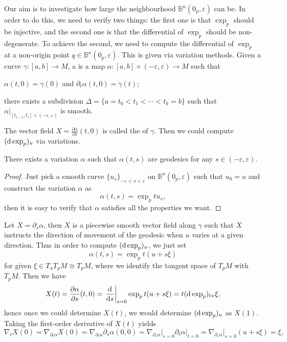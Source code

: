 Our aim is to investigate how large the neighbourhood $\mathbb{B}^n (0_p ,\varepsilon )$ can be. In order to do this, we need to verify two things: the first one is that $\exp_p $ should be injective, and the second one is that the differential of $\exp_p $ should be non-degenerate. To achieve the second, we need to compute the differential of $\exp_p $ at a non-origin point $q\in\mathbb{B}^n (0_p ,\varepsilon )$. This is given via variation methods. Given a curve $\gamma\colon [a,b]\to M$, a  is a map $\alpha\colon [a,b]\times (-\varepsilon ,\varepsilon )\to M$ such that \begin{enumerate*}\item $\alpha (t,0)=\gamma (0)$ and $\partial_t\alpha (t,0)=\dot{\gamma } (t)$;\item there exists a subdivision $\Delta =\{a=t_0 <t_1 <\dotsb <t_k =b\} $ such that $\alpha\vert_{[t_{i-1} ,t_i ]\times (-\varepsilon ,\varepsilon )} $ is smooth.\end{enumerate*} The vector field $X=\frac{\partial\alpha }{\partial s} (t,0)$ is called the  of $\gamma $. Then we could compute $(\mathrm{d}\exp_p )_u $ via variations.
\begin{prp}
There exists a variation $\alpha $ such that $\alpha (t,s)$ are geodesics for any $s\in (-\varepsilon ,\varepsilon )$.
\end{prp}
\begin{proof}
Just pick a smooth curve $\{u_s\}_{-\varepsilon <s<\varepsilon } $ on $\mathbb{B}^n (0_p ,\varepsilon )$ such that $u_0 =u$ and construct the variation $\alpha $ as
\[
\alpha (t,s)=\exp_p tu_s,
\]
then it is easy to verify that $\alpha $ satisfies all the properties we want.
\end{proof}
Let $X=\partial_s\alpha $, then $X$ is a piecewise smooth vector field along $\gamma $ such that $X$ instructs the direction of movement of the geodesic when $u$ varies at a given direction. Thus in order to compute $(\mathrm{d}\exp_p )_u $, we just set
\[
\alpha (t,s)=\exp_p t(u+s\xi )
\]
for given $\xi\in T_uT_p M\cong T_p M$, where we identify the tangent space of $T_p M$ with $T_p M$. Then we have
\[
X(t)=\frac{\partial\alpha }{\partial s} (t,0)=\left.\frac{\mathrm{d} }{\mathrm{d} s}\right\vert_{s=0}\exp_p t(u+s\xi )=t(\mathrm{d}\exp_p )_{tu}\xi,
\]
hence once we could determine $X(t)$, we would determine $(\mathrm{d}\exp_p )_u $ as $X(1)$. Taking the first-order derivative of $X(t)$ yields
\[
\nabla_t X(0)=\nabla_{\partial_t\alpha } X(0)=\nabla_{\partial_t\alpha }\partial_s\alpha (0,0)=\nabla_{\partial_s\alpha }\vert_{s=0}\partial_t\alpha\vert_{t=0} =\nabla_{\partial_s\alpha }\vert_{s=0}(u+s\xi )=\xi ,
\]
